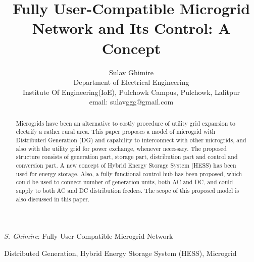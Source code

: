 \documentclass[journal,twoside]{IEEEtran}
\begin{document}
    \setcounter{page}{18}

\title{Fully User-Compatible Microgrid Network and Its Control: A Concept}

\author{
    Sulav Ghimire\\
    Department of Electrical Engineering\\
    Institute Of Engineering(IoE), Pulchowk Campus, Pulchowk, Lalitpur\\
email: sulavggg@gmail.com\\
}

%
{\textit{S. Ghimire}: Fully User-Compatible Microgrid Network}

\maketitle
\begin{abstract}
Microgrids have been an alternative to costly procedure of utility grid expansion to electrify a rather rural area. This paper proposes a model of microgrid with Distributed Generation (DG) and capability to interconnect with other microgrids, and also with the utility grid for power exchange, whenever necessary. The proposed structure consists of generation part, storage part, distribution part and control and conversion part. A new concept of Hybrid Energy Storage System (HESS) has been used for energy storage. Also, a fully functional control hub has been proposed, which could be used to connect number of generation units, both AC and DC, and could supply to both AC and DC distribution feeders. The scope of this proposed model is also discussed in this paper.
\end{abstract}
\begin{IEEEkeywords}
Distributed Generation, Hybrid Energy Storage System (HESS), Microgrid
\end{IEEEkeywords}
\end{document}
